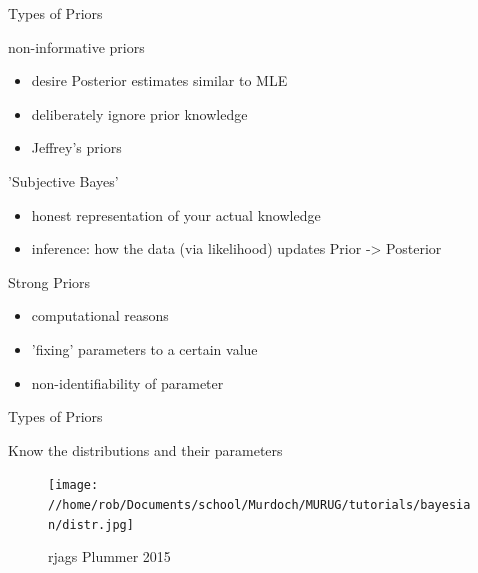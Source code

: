 \documentclass[presentation]{beamer}
\begin{document}
\begin{frame}[label=sec-22]{Types of Priors}
\begin{block}{non-informative priors}
\begin{itemize}
\item desire Posterior estimates similar to MLE
\item deliberately ignore prior knowledge
\item Jeffrey's priors
\end{itemize}
\end{block}

\begin{block}{'Subjective Bayes'}
\begin{itemize}
\item honest representation of your actual knowledge
\item inference: how the data (via likelihood) updates Prior -> Posterior
\end{itemize}
\end{block}

\begin{block}{Strong Priors}
\begin{itemize}
\item computational reasons
\item 'fixing' parameters to a certain value
\item non-identifiability of parameter
\end{itemize}
\end{block}
\end{frame}

\begin{frame}[label=sec-23]{Types of Priors}
\begin{block}{Know the distributions and their parameters}
\begin{figure}[htb]
\centering
\texttt{[image: //home/rob/Documents/school/Murdoch/MURUG/tutorials/bayesian/distr.jpg]}
\caption{\label{fig:foo}rjags Plummer 2015}
\end{figure}
\end{block}
\end{frame}
\end{document}
